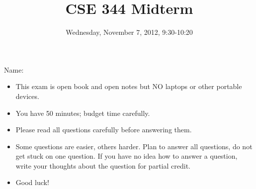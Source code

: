 \documentclass[addpoints,answers,12pt]{exam}
\begin{document}
\title{CSE 344  Midterm}
\author{}
\date{Wednesday, November 7, 2012, 9:30-10:20}

\maketitle

\begin{center}
{
\vspace{1cm}

{\LARGE Name:\enspace\makebox[3in]{\hrulefill}}


\vspace{1cm}

\gradetable
}
\end{center}

\begin{itemize}
\item This exam is open book and open notes but NO laptops or other portable devices.
\item You have 50 minutes; budget time carefully.
\item Please read all questions carefully before answering them.
\item Some questions are easier, others harder.  Plan to answer all
  questions, do not get stuck on one question. If you have no idea how to answer
a question, write your thoughts about the question for partial credit.
\item Good luck!
\end{itemize}

\newpage
\end{document}

